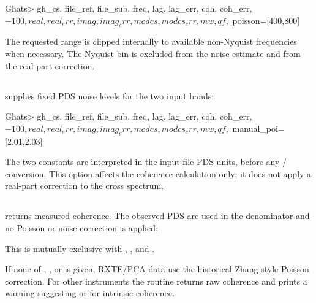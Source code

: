 \begin{ghatsconsole}
Ghats> gh_cs, file_ref, file_sub, freq, lag, lag_err, coh, coh_err, $
       -100, real, real_err, imag, imag_err, modcs, modcs_err, mw, qf, $
       poisson=[400,800]
\end{ghatsconsole}

The requested range is clipped internally to available non-Nyquist
frequencies when necessary.  The Nyquist bin is excluded from the noise
estimate and from the real-part correction.

\subsection{}

 supplies fixed PDS noise levels for the two input
bands:

\begin{ghatsconsole}
Ghats> gh_cs, file_ref, file_sub, freq, lag, lag_err, coh, coh_err, $
       -100, real, real_err, imag, imag_err, modcs, modcs_err, mw, qf, $
       manual_poi=[2.01,2.03]
\end{ghatsconsole}

The two constants are interpreted in the input-file PDS units, before any
/ conversion.  This option affects the coherence
calculation only; it does not apply a real-part correction to the cross
spectrum.

\subsection{}

 returns measured coherence.  The observed PDS are used in
the denominator and no Poisson or noise correction is applied:


This is mutually exclusive with , , and
.

\begin{ghatsnote}
If none of , , or  is
given, RXTE/PCA data use the historical Zhang-style Poisson correction.
For other instruments the routine returns raw coherence and prints a warning
suggesting  or  for
intrinsic coherence.
\end{ghatsnote}

